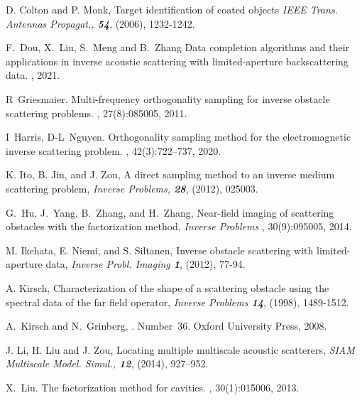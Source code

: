 \documentclass[final]{siamltex}
\begin{document}
\begin{thebibliography}{10}
 D. Colton and P. Monk,
	Target identification of coated objects
 {\em IEEE Trans. Antennas Propagat., \bf54}, (2006), 1232-1242.


F.~Dou, X.~Liu, S.~Meng and B.~Zhang
\newblock Data completion algorithms and their applications in inverse acoustic scattering with limited-aperture backscattering data.
, 2021.

R~Griesmaier.
\newblock Multi-frequency orthogonality sampling for inverse obstacle
  scattering problems.
, 27(8):085005, 2011.

I~Harris, D-L~Nguyen.
\newblock Orthogonality sampling method for the electromagnetic inverse scattering problem.
, 42(3):722--737, 2020.

K. Ito, B. Jin, and J. Zou, A direct sampling method to an inverse medium scattering problem,
{\em Inverse Problems, \bf28}, (2012), 025003.

 G.~Hu,   J.~Yang, B.~Zhang, and H.~Zhang,
	Near-field imaging of scattering obstacles with the factorization method,
	{\em Inverse Problems }, 30(9):095005, 2014.

 M. Ikehata, E. Niemi, and S. Siltanen,
	Inverse obstacle scattering with limited-aperture data,
	{\em Inverse Probl. Imaging \bf1}, (2012), 77-94.

 A. Kirsch,
	Characterization of the shape of a scattering obstacle using the spectral data of the far field operator,
	{\em Inverse Problems \bf14}, (1998), 1489-1512.

A.~Kirsch and N.~Grinberg.
.
\newblock Number~36. Oxford University Press, 2008.

J. Li, H. Liu and J. Zou,
Locating multiple multiscale acoustic scatterers,
{\em SIAM Multiscale Model. Simul., \bf12}, (2014), 927--952.



X.~Liu.
\newblock The factorization method for cavities.
, 30(1):015006, 2013.


\end{thebibliography}
\end{document}
